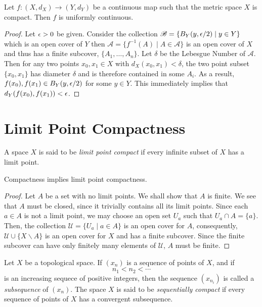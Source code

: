 \begin{theorem}
    Let $f:(X, d_X)\to (Y, d_Y)$ be a continuous map such that the metric space $X$ is compact. Then $f$ is uniformly continuous.
\end{theorem}
\begin{proof}
    Let $\epsilon > 0$ be given. Consider the collection $\mathscr{B} = \{B_Y(y,\epsilon/2)\mid y\in Y\}$ which is an open cover of $Y$ then $\mathscr{A} = \{f^{-1}(A)\mid A\in\mathscr{A}\}$ is an open cover of $X$ and thus has a finite subcover, $\{A_1,\ldots,A_n\}$. Let $\delta$ be the Lebesgue Number of $\mathscr{A}$. Then for any two points $x_0, x_1\in X$ with $d_X(x_0, x_1) < \delta$, the two point subset $\{x_0, x_1\}$ has diameter $\delta$ and is therefore contained in some $A_i$. As a result, $f(x_0), f(x_1)\in B_Y(y,\epsilon/2)$ for some $y\in Y$. This immediately implies that $d_Y(f(x_0), f(x_1)) < \epsilon$.
\end{proof}

\section{Limit Point Compactness}
\begin{definition}
    A space $X$ is said to be \textit{limit point compact} if every infinite subset of $X$ has a limit point.
\end{definition}

\begin{theorem}
    Compactness implies limit point compactness.
\end{theorem}
\begin{proof}
    Let $A$ be a set with no limit points. We shall show that $A$ is finite. We see that $A$ must be closed, since it trivially contains all its limit points. Since each $a\in A$ is not a limit point, we may choose an open set $U_a$ such that $U_a\cap A = \{a\}$. Then, the collection $\mathscr{U} = \{U_a\mid a\in A\}$ is an open cover for $A$, consequently, $\mathscr{U}\cup\{X\backslash A\}$ is an open cover for $X$ and has a finite subcover. Since the finite subcover can have only finitely many elements of $\mathscr{U}$, $A$ must be finite.
\end{proof}

\begin{definition}
    Let $X$ be a topological space. If $(x_n)$ is a sequence of points of $X$, and if 
    \begin{equation*}
        n_1 < n_2 < \cdots
    \end{equation*}
    is an increasing sequece of positive integers, then the sequence $(x_{n_i})$ is called a \textit{subsequence} of $(x_n)$. The space $X$ is said to be \textit{sequentially compact} if every sequence of points of $X$ has a convergent subsequence.
\end{definition}

